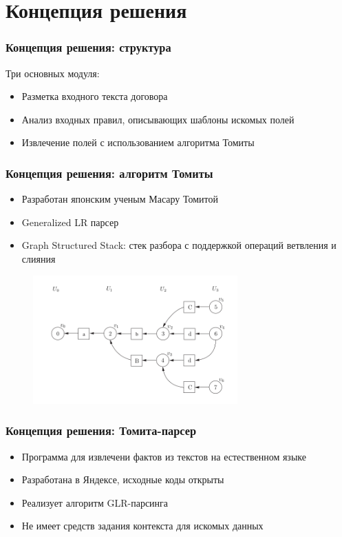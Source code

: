 \documentclass[10pt]{beamer}
\begin{document}
\section{Концепция решения}
\begin{frame}
\frametitle{Концепция решения: структура}
Три основных модуля:
\begin{itemize}
	\item Разметка входного текста договора
	\item Анализ входных правил, описывающих шаблоны искомых полей
	\item Извлечение полей с использованием алгоритма Томиты
\end{itemize}
\end{frame}

\begin{frame}[fragile]
\frametitle{Концепция решения: алгоритм Томиты}
\begin{itemize}
	\item Разработан японским ученым Масару Томитой
	\item Generalized LR парсер
	\item Graph Structured Stack: стек разбора с поддержкой операций ветвления и слияния
\end{itemize}
\begin{figure}%
\centering
\includegraphics[width=0.7\textwidth]{img/gss-step5.png}
\end{figure}
\end{frame}

\begin{frame}
\frametitle{Концепция решения: Томита-парсер}
\begin{itemize}
	\item Программа для извлечени фактов из текстов на естественном языке
	\item Разработана в Яндексе, исходные коды открыты
	\item Реализует алгоритм GLR-парсинга
	\item Не имеет средств задания контекста для искомых данных
\end{itemize}
\end{frame}
\end{document}
